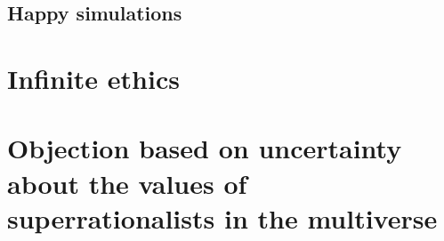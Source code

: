 \documentclass{book}
\begin{document}
\subsection{Happy simulations}
\label{Happy simulations}

\section{Infinite ethics}
\label{Infinite ethics}

\section{Objection based on uncertainty about the values of superrationalists in the multiverse}
\label{Objection based on uncertainty about the values of superrationalists in the multiverse}

\begin{sloppypar} %
\printbibliography
\end{sloppypar}
\end{document}
